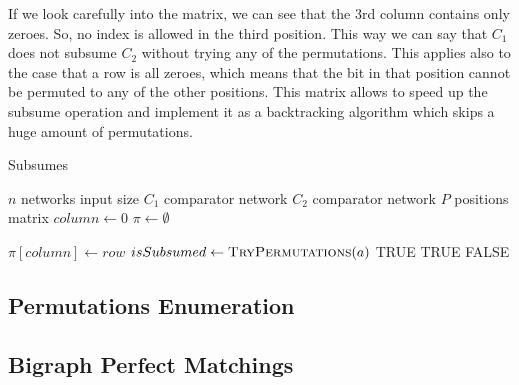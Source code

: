 \documentclass[../main.tex]{subfiles}
\begin{document}
	If we look carefully into the matrix, we can see that the 3rd column contains only zeroes. So, no index is allowed in the third position. This way we can say that $C_1$ does not subsume $C_2$ without trying any of the permutations. This applies also to the case that a row is all zeroes, which means that the bit in that position cannot be permuted to any of the other positions. This matrix allows to speed up the subsume operation and implement it as a backtracking algorithm which skips a huge amount of permutations.
	
	\begin{algorithm}[H]
		\caption {Subsumes}
		\begin{algorithmic}
			\State $n$ networks input size
			\State $C_1$ comparator network
			\State $C_2$ comparator network
			\State $P$ positions matrix
			\State $column \leftarrow 0$
			\State $\pi \leftarrow \emptyset $ 
			
			\State $\pi[column] \leftarrow row $
			\State $isSubsumed\gets\textsc{TryPermutations}(a)$
			\Return TRUE
			\EndIf
			\EndIf
			\EndFor
			\Return TRUE
			\Else {}
			\Return FALSE
			\EndIf
			\EndProcedure
		\end{algorithmic}
	\end{algorithm}
	\subsection{Permutations Enumeration}
	\subsection{Bigraph Perfect Matchings}
\end{document}
